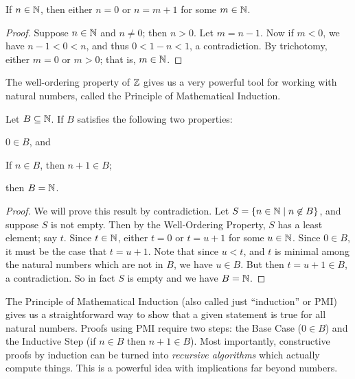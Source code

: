 \begin{prop}
If \(n \in \mathbb{N}\), then either \(n = 0\) or \(n = m+1\) for some \(m \in \mathbb{N}\).
\end{prop}

\begin{proof}
Suppose \(n \in \mathbb{N}\) and \(n \neq 0\); then \(n > 0\). Let \(m = n-1\). Now if \(m < 0\), we have \(n-1 < 0 < n\), and thus \(0 < 1-n < 1\), a contradiction. By trichotomy, either \(m = 0\) or \(m > 0\); that is, \(m \in \mathbb{N}\).
\end{proof}

The well-ordering property of \(\mathbb{Z}\) gives us a very powerful tool for working with natural numbers, called the Principle of Mathematical Induction.

\begin{prop}
Let \(B \subseteq \mathbb{N}\). If \(B\) satisfies the following two properties:
\begin{proplist}
\item \(0 \in B\), and
\item If \(n \in B\), then \(n+1 \in B\);
\end{proplist}
then \(B = \mathbb{N}\).
\end{prop}

\begin{proof}
We will prove this result by contradiction. Let \(S = \{ n \in \mathbb{N} \mid n \not\in B \}\), and suppose \(S\) is not empty. Then by the Well-Ordering Property, \(S\) has a least element; say \(t\). Since \(t \in \mathbb{N}\), either \(t = 0\) or \(t = u+1\) for some \(u \in \mathbb{N}\). Since \(0 \in B\), it must be the case that \(t = u+1\). Note that since \(u < t\), and \(t\) is minimal among the natural numbers which are not in \(B\), we have \(u \in B\). But then \(t = u+1 \in B\), a contradiction. So in fact \(S\) is empty and we have \(B = \mathbb{N}\).
\end{proof}

The Principle of Mathematical Induction (also called just ``induction'' or PMI) gives us a straightforward way to show that a given statement is true for all natural numbers. Proofs using PMI require two steps: the Base Case (\(0 \in B\)) and the Inductive Step (if \(n \in B\) then \(n+1 \in B\)). Most importantly, constructive proofs by induction can be turned into \emph{recursive algorithms} which actually compute things. This is a powerful idea with implications far beyond numbers.



\Exercises%


